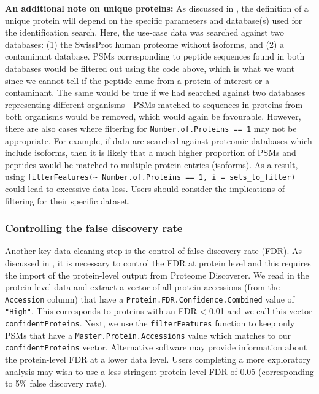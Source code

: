 \documentclass[9pt,a4paper,]{extarticle}
\begin{document}
\textbf{An additional note on unique proteins:}
As discussed in \citet{Hutchings2023}, the definition of a unique protein will depend
on the specific parameters and database(s) used for the identification search.
Here, the use-case data was searched against two databases: (1) the SwissProt
human proteome without isoforms, and (2) a contaminant database. PSMs corresponding
to peptide sequences found in both databases would be filtered out using the
code above, which is what we want since we cannot tell if the peptide came from
a protein of interest or a contaminant. The same would be true if we had searched
against two databases representing different organisms - PSMs matched to sequences
in proteins from both organisms would be removed, which would again be favourable.
However, there are also cases where filtering for \texttt{Number.of.Proteins\ ==\ 1}
may not be appropriate. For example, if data are searched against proteomic
databases which include isoforms, then it is likely that a much higher proportion
of PSMs and peptides would be matched to multiple protein entries (isoforms). As
a result, using \texttt{filterFeatures(\textasciitilde{}\ Number.of.Proteins\ ==\ 1,\ i\ =\ sets\_to\_filter)}
could lead to excessive data loss. Users should consider the implications of
filtering for their specific dataset.

\subsubsection{Controlling the false discovery rate}\label{controlling-the-false-discovery-rate}

Another key data cleaning step is the control of false discovery rate (FDR). As
discussed in \citet{Hutchings2023}, it is necessary to control the FDR at protein level
and this requires the import of the protein-level output from Proteome Discoverer.
We read in the protein-level data and extract a vector of all protein accessions
(from the \texttt{Accession} column) that have a \texttt{Protein.FDR.Confidence.Combined}
value of \texttt{"High"}. This corresponds to proteins with an FDR \textless{} 0.01 and we call
this vector \texttt{confidentProteins}. Next, we use the \texttt{filterFeatures} function to
keep only PSMs that have a \texttt{Master.Protein.Accessions} value which matches to
our \texttt{confidentProteins} vector. Alternative software may provide information
about the protein-level FDR at a lower data level. Users completing a more
exploratory analysis may wish to use a less stringent protein-level FDR of 0.05
(corresponding to 5\% false discovery rate).
\end{document}
